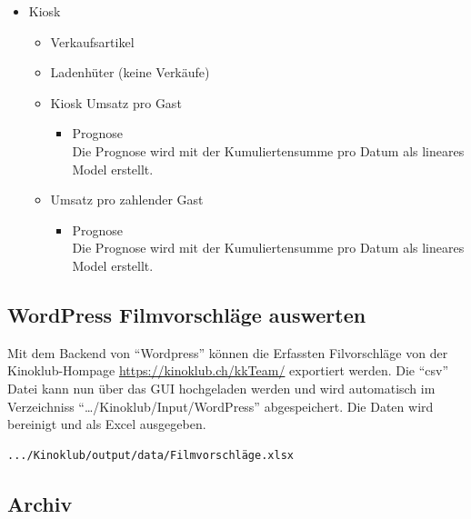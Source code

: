 \documentclass[
]{article}
\providecommand{\tightlist}{%
  \setlength{\itemsep}{0pt}\setlength{\parskip}{0pt}}
\begin{document}
\begin{itemize}
  \begin{itemize}
  \tightlist
  \item
    Prognose\\
    Die Prognose wird mit der Kumuliertensumme pro Datum als lineares
    Model erstellt.
  \end{itemize}
\item
  Kiosk

  \begin{itemize}
  \tightlist
  \item
    Verkaufsartikel
  \item
    Ladenhüter (keine Verkäufe)
  \item
    Kiosk Umsatz pro Gast

    \begin{itemize}
    \tightlist
    \item
      Prognose\\
      Die Prognose wird mit der Kumuliertensumme pro Datum als lineares
      Model erstellt.
    \end{itemize}
  \item
    Umsatz pro zahlender Gast

    \begin{itemize}
    \tightlist
    \item
      Prognose\\
      Die Prognose wird mit der Kumuliertensumme pro Datum als lineares
      Model erstellt.
    \end{itemize}
  \end{itemize}
\end{itemize}

\subsection{WordPress Filmvorschläge
auswerten}\label{wordpress-filmvorschluxe4ge-auswerten}

Mit dem Backend von ``Wordpress'' können die Erfassten Filvorschläge von
der Kinoklub-Hompage \url{https://kinoklub.ch/kkTeam/} exportiert
werden. Die ``csv'' Datei kann nun über das GUI hochgeladen werden und
wird automatisch im Verzeichniss ``\ldots/Kinoklub/Input/WordPress''
abgespeichert. Die Daten wird bereinigt und als Excel ausgegeben.

\begin{verbatim}
.../Kinoklub/output/data/Filmvorschläge.xlsx
\end{verbatim}

\subsection{Archiv}\label{archiv}
\end{document}
